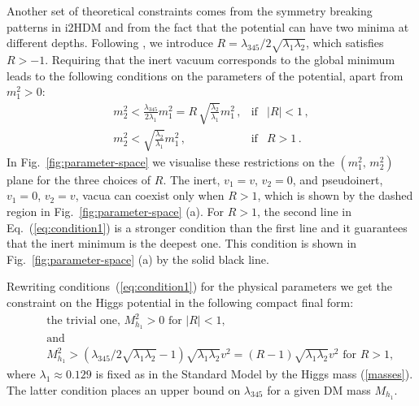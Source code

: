 \documentclass[12pt,a4paper]{article}
\begin{document}
Another set of theoretical constraints comes from the symmetry breaking patterns in i2HDM \cite{Deshpande:1977rw}
and from the fact that the potential can have two minima at different depths.
Following \cite{Ginzburg:2010wa},
we introduce $R=\lambda_{345}/2\sqrt{\lambda_1\lambda_2}$,
which satisfies $R> -1$.
Requiring that the inert vacuum corresponds to the global minimum
leads to the following conditions on the parameters of the potential, apart from $m_1^2 > 0$:
\begin{eqnarray}
\label{eq:condition1}
m_2^2 < \frac{\lambda_{345}}{2\lambda_1} m_1^2 = R\, \sqrt{\frac{\lambda_2}{\lambda_1}} m_1^2 \,,&\mbox{if}& |R| < 1\,,\nonumber\\ 
m_2^2 < \sqrt{\frac{\lambda_2}{\lambda_1}} m_1^2 \,, &\mbox{if}& R > 1\,.
\end{eqnarray}
In Fig.~\ref{fig:parameter-space} we visualise these restrictions on the $(m_1^2,\, m_2^2)$ plane
for the three choices of $R$.
The inert, $v_1 = v$, $v_2=0$, and pseudoinert, $v_1 = 0$, $v_2 = v$, vacua can coexist only when $R>1$,
which is shown by the dashed region in Fig.~\ref{fig:parameter-space} (a).
For $R > 1$, the second line in Eq.~(\ref{eq:condition1}) is a stronger condition
than the first line and it guarantees that the inert minimum is the deepest one.
This condition is shown in Fig.~\ref{fig:parameter-space} (a) by the solid black line.

Rewriting  conditions~(\ref{eq:condition1}) for the physical parameters 
we get  the constraint on the Higgs potential in the following compact final form:
\begin{eqnarray}
\label{eq:scalar-pot1}
&&\mbox{the trivial one, } M_{h_1}^2 > 0 \mbox{ for } |R|<1, \\
&&\mbox{and}\nonumber\\
\label{eq:scalar-pot2}
&&M_{h_1}^2 > 
  (\lambda_{345}/2\sqrt{\lambda_1\lambda_2}-1) \sqrt{\lambda_1\lambda_2} v^2
=  (R-1) \sqrt{\lambda_1\lambda_2} v^2 \mbox{ for } R>1,
\end{eqnarray}
where $\lambda_1 \approx 0.129$ is fixed as in the Standard Model by the Higgs mass (\ref{masses}). 
The latter condition places an upper bound on $\lambda_{345}$ for a given DM mass $M_{h_1}$.


%
\end{document}

